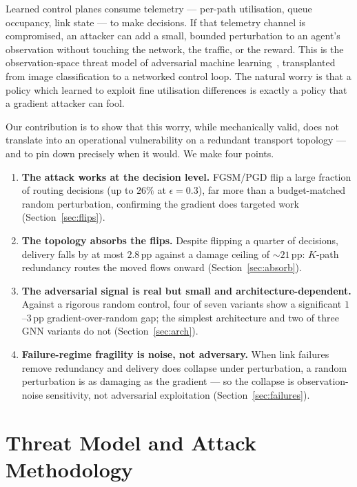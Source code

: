 \documentclass[10pt,journal,comsoc]{IEEEtran}
\begin{document}
Learned control planes consume telemetry --- per-path utilisation, queue occupancy,
link state --- to make decisions. If that telemetry channel is compromised, an
attacker can add a small, bounded perturbation to an agent's observation without
touching the network, the traffic, or the reward. This is the observation-space
threat model of adversarial machine learning~\cite{goodfellow2015,huang2017adversarial},
transplanted from image classification to a networked control loop. The natural
worry is that a policy which learned to exploit fine utilisation differences is
exactly a policy that a gradient attacker can fool.

Our contribution is to show that this worry, while mechanically valid, does not
translate into an operational vulnerability on a redundant transport topology --- and
to pin down precisely when it would. We make four points.
\begin{enumerate}
  \item \textbf{The attack works at the decision level.} FGSM/PGD flip a large
  fraction of routing decisions (up to $26\%$ at $\epsilon{=}0.3$), far more than a
  budget-matched random perturbation, confirming the gradient does targeted work
  (Section~\ref{sec:flips}).
  \item \textbf{The topology absorbs the flips.} Despite flipping a quarter of
  decisions, delivery falls by at most $2.8$\,pp against a damage ceiling of
  ${\sim}21$\,pp: $K$-path redundancy routes the moved flows onward
  (Section~\ref{sec:absorb}).
  \item \textbf{The adversarial signal is real but small and architecture-dependent.}
  Against a rigorous random control, four of seven variants show a significant
  $1$--$3$\,pp gradient-over-random gap; the simplest architecture and two of three
  GNN variants do not (Section~\ref{sec:arch}).
  \item \textbf{Failure-regime fragility is noise, not adversary.} When link
  failures remove redundancy and delivery does collapse under perturbation, a random
  perturbation is as damaging as the gradient --- so the collapse is observation-noise
  sensitivity, not adversarial exploitation (Section~\ref{sec:failures}).
\end{enumerate}

\section{Threat Model and Attack Methodology}
\label{sec:threat}
\end{document}
